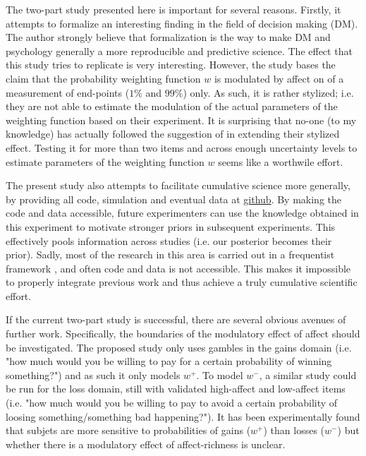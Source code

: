 \documentclass[12pt]{article}
\begin{document}
The two-part study presented here is important
for several reasons. Firstly, it attempts to
formalize an interesting finding in the
field of decision making (DM). The author
strongly believe that formalization is the way to
make DM and psychology generally a more
reproducible and predictive science.
The effect that this study tries to replicate
\autocite{rottenstreich2001money} is
very interesting. However, the study
bases the claim that the
probability weighting function $w$ is
modulated by affect on of a measurement of end-points
($1\%$ and $99\%$) only.
As such, it is rather stylized; i.e. they
are not able to estimate the modulation of
the actual parameters of the weighting function
based on their experiment.
It is surprising that no-one (to my knowledge)
has actually followed the suggestion
of \autocite{rottenstreich2001money} in extending
their stylized effect. Testing it for more than
two items and across enough uncertainty
levels to estimate parameters of the weighting
function $w$ seems like a worthwile effort.

\vspace{3mm}
The present study also attempts to facilitate
cumulative science more generally, by providing
all code, simulation and eventual data at
\href{https://github.com/victor-m-p/BayesianDecisionWeights}
{github}.
By making the code and data accessible, future
experimenters can use the knowledge obtained in
this experiment to motivate stronger priors in
subsequent experiments. This effectively
pools information across studies
(i.e. our posterior becomes their prior). Sadly,
most of the research in this area is carried
out in a frequentist framework
\autocite{gonzalez1999shape, rottenstreich2001money,
hsee2004music}, and often
code and data is not accessible. This makes it
impossible to properly integrate previous work
and thus achieve a truly cumulative scientific effort.

\vspace{3mm}
If the current two-part study is successful,
there are several obvious avenues of further
work. Specifically, the boundaries of the modulatory
effect of affect should be investigated. The
proposed study
only uses gambles in the gains domain (i.e. "how
much would you be willing to pay for a
certain probability of winning something?")
and as such it only models $w^{+}$. To model
$w^{-}$, a similar
study could be run for the loss domain, still with
validated high-affect and low-affect items (i.e. "how
much would you be willing to pay to avoid a
certain probability of loosing something/something
bad happening?"). It has been experimentally
found that subjets are more sensitive to
probabilities of gains ($w^{+}$) than
losses ($w^{-}$) \autocite{
abdellaoui2010separating} but whether there is a
modulatory effect of affect-richness is unclear.\\
\end{document}
